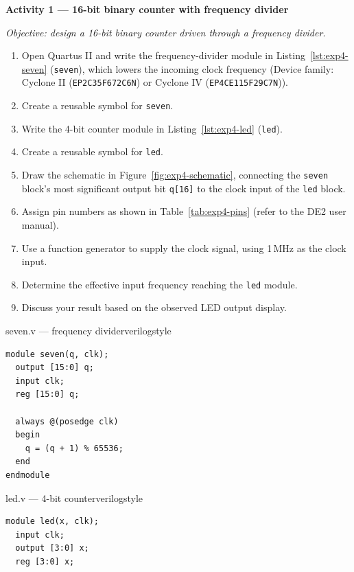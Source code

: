 \begin{procedure}

  \textbf{Activity 1 --- 16-bit binary counter with frequency divider}\vspace{2pt}

  \textit{Objective: design a 16-bit binary counter driven through a frequency divider.}

  \begin{enumerate}
    \item Open Quartus II and write the frequency-divider module in Listing~\ref{lst:exp4-seven} (\texttt{seven}), which lowers the incoming clock frequency (Device family: Cyclone II (\texttt{EP2C35F672C6N}) or Cyclone IV (\texttt{EP4CE115F29C7N})).
    \item Create a reusable symbol for \texttt{seven}.
    \item Write the 4-bit counter module in Listing~\ref{lst:exp4-led} (\texttt{led}).
    \item Create a reusable symbol for \texttt{led}.
    \item Draw the schematic in Figure~\ref{fig:exp4-schematic}, connecting the \texttt{seven} block's most significant output bit \texttt{q[16]} to the clock input of the \texttt{led} block.
    \item Assign pin numbers as shown in Table~\ref{tab:exp4-pins} (refer to the DE2 user manual).
    \item Use a function generator to supply the clock signal, using 1\,MHz as the clock input.
    \item Determine the effective input frequency reaching the \texttt{led} module.
    \item Discuss your result based on the observed LED output display.
  \end{enumerate}

  \begin{codepanel}{seven.v --- frequency divider}{verilogstyle}
    \begin{lstlisting}
module seven(q, clk);
  output [15:0] q;
  input clk;
  reg [15:0] q;

  always @(posedge clk)
  begin
    q = (q + 1) % 65536;
  end
endmodule
\end{lstlisting}
  \end{codepanel}
  \vspace{-4pt}

  \begin{codepanel}{led.v --- 4-bit counter}{verilogstyle}
    \begin{lstlisting}
module led(x, clk);
  input clk;
  output [3:0] x;
  reg [3:0] x;


\end{lstlisting}
\end{codepanel}
\end{procedure}
